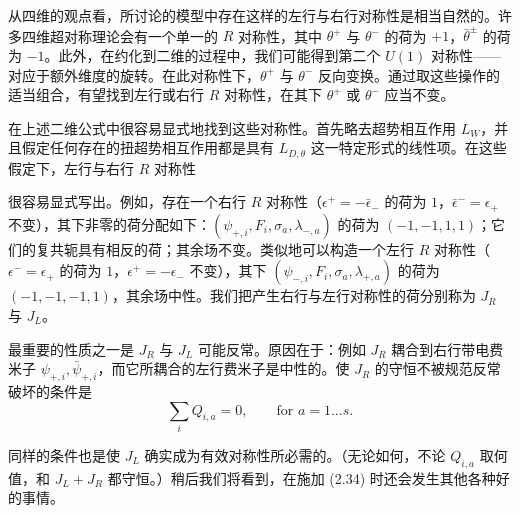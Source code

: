 从四维的观点看，所讨论的模型中存在这样的左行与右行对称性是相当自然的。许多四维超对称理论会有一个单一的 $R$ 对称性，其中 $\theta^+$ 与 $\theta^-$ 的荷为 $+1$，$\bar\theta^\pm$ 的荷为 $-1$。此外，在约化到二维的过程中，我们可能得到第二个 $U(1)$ 对称性——对应于额外维度的旋转。在此对称性下，$\theta^+$ 与 $\theta^-$ 反向变换。通过取这些操作的适当组合，有望找到左行或右行 $R$ 对称性，在其下 $\theta^+$ 或 $\theta^-$ 应当不变。

在上述二维公式中很容易显式地找到这些对称性。首先略去超势相互作用 $L_W$，并且假定任何存在的扭超势相互作用都是具有 $L_{D,\theta}$ 这一特定形式的线性项。在这些假定下，左行与右行 $R$ 对称性

\label{op:15}

很容易显式写出。例如，存在一个右行 $R$ 对称性（$\epsilon^+=-\bar\epsilon_-$ 的荷为 $1$，$\bar\epsilon^-=\epsilon_+$ 不变），其下非零的荷分配如下：$(\psi_{+,i},F_i,\sigma_a,\lambda_{-,a})$ 的荷为 $(-1,-1,1,1)$；它们的复共轭具有相反的荷；其余场不变。类似地可以构造一个左行 $R$ 对称性（$\epsilon^-=\epsilon_+$ 的荷为 $1$，$\epsilon^+=-\epsilon_-$ 不变），其下 $(\psi_{-,i},F_i,\sigma_a,\lambda_{+,a})$ 的荷为 $(-1,-1,-1,1)$，其余场中性。我们把产生右行与左行对称性的荷分别称为 $J_R$ 与 $J_L$。

最重要的性质之一是 $J_R$ 与 $J_L$ 可能反常。原因在于：例如 $J_R$ 耦合到右行带电费米子 $\psi_{+,i},\bar\psi_{+,i}$，而它所耦合的左行费米子是中性的。使 $J_R$ 的守恒不被规范反常破坏的条件是
\begin{equation}\tag{2.34}
\sum_i Q_{i,a}=0,\qquad \text{for } a=1\ldots s.
\end{equation}


同样的条件也是使 $J_L$ 确实成为有效对称性所必需的。（无论如何，不论 $Q_{i,a}$ 取何值，和 $J_L+J_R$ 都守恒。）稍后我们将看到，在施加 (2.34) 时还会发生其他各种好的事情。

